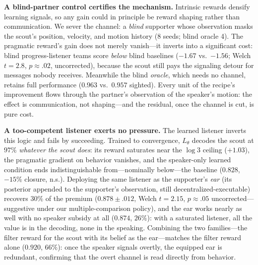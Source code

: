 \documentclass{article}
\newcommand{\Ltheta}{L_\theta}
\begin{document}
\textbf{A blind-partner control certifies the mechanism.} Intrinsic rewards densify learning signals, so any gain could in principle be reward shaping rather than communication. We sever the channel: a \emph{blind} supporter whose observation masks the scout's position, velocity, and motion history (8 seeds; blind oracle 4). The pragmatic reward's gain does not merely vanish---it inverts into a significant cost: blind progress-listener teams score \emph{below} blind baselines ($-1.67$ vs.\ $-1.56$; Welch $t=2.8$, $p\approx.02$, uncorrected), because the scout still pays the signaling detour for messages nobody receives. Meanwhile the blind \emph{oracle}, which needs no channel, retains full performance ($0.963$ vs.\ $0.957$ sighted). Every unit of the recipe's improvement flows through the partner's observation of the speaker's motion: the effect is communication, not shaping---and the residual, once the channel is cut, is pure cost.

\textbf{A too-competent listener exerts no pressure.} The learned listener inverts this logic and fails by succeeding. Trained to convergence, $\Ltheta$ decodes the scout at $97\%$ \emph{whatever the scout does}: its reward saturates near the $\log 3$ ceiling ($+1.03$), the pragmatic gradient on behavior vanishes, and the speaker-only learned condition ends indistinguishable from---nominally below---the baseline ($0.828$, $-15\%$ closure, n.s.). Deploying the same listener as the supporter's \emph{ear} (its posterior appended to the supporter's observation, still decentralized-executable) recovers $30\%$ of the premium ($0.878\pm.012$, Welch $t=2.15$, $p\approx.05$ uncorrected---suggestive under our multiple-comparison policy), and the ear works nearly as well with no speaker subsidy at all ($0.874$, $26\%$): with a saturated listener, all the value is in the decoding, none in the speaking. Combining the two families---the filter reward for the scout with its belief as the ear---matches the filter reward alone ($0.920$, $66\%$): once the speaker signals overtly, the equipped ear is redundant, confirming that the overt channel is read directly from behavior.
\end{document}
